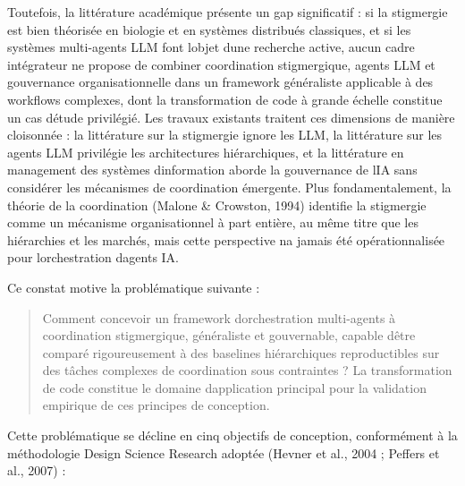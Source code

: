 \documentclass[12pt,a4paper]{article}
\begin{document}
Toutefois, la littérature académique présente un gap significatif : si
la stigmergie est bien théorisée en biologie et en systèmes distribués
classiques, et si les systèmes multi-agents LLM font
l\textquotesingle objet d\textquotesingle une recherche active, aucun
cadre intégrateur ne propose de combiner coordination stigmergique,
agents LLM et gouvernance organisationnelle dans un framework
généraliste applicable à des workflows complexes, dont la transformation
de code à grande échelle constitue un cas d\textquotesingle étude
privilégié. Les travaux existants traitent ces dimensions de
manière cloisonnée : la littérature sur la stigmergie ignore les LLM, la
littérature sur les agents LLM privilégie les architectures
hiérarchiques, et la littérature en management des systèmes
d\textquotesingle information aborde la gouvernance de
l\textquotesingle IA sans considérer les mécanismes de coordination
émergente. Plus fondamentalement, la théorie de la coordination
(Malone \& Crowston, 1994) identifie la stigmergie comme un mécanisme
organisationnel à part entière, au même titre que les hiérarchies et les
marchés, mais cette perspective n\textquotesingle a jamais été
opérationnalisée pour l\textquotesingle orchestration d\textquotesingle agents IA.

Ce constat motive la problématique suivante :

\begin{quote}
Comment concevoir un framework d\textquotesingle orchestration
multi-agents à coordination stigmergique, généraliste et gouvernable,
capable d\textquotesingle être comparé rigoureusement à des baselines
hiérarchiques reproductibles sur des tâches complexes de coordination
sous contraintes ?
La transformation de code constitue le domaine
d\textquotesingle application principal pour la validation empirique de
ces principes de conception.
\end{quote}

Cette problématique se décline en cinq objectifs de conception,
conformément à la méthodologie Design Science Research adoptée
(Hevner et al., 2004 ; Peffers et al., 2007) :
\end{document}

